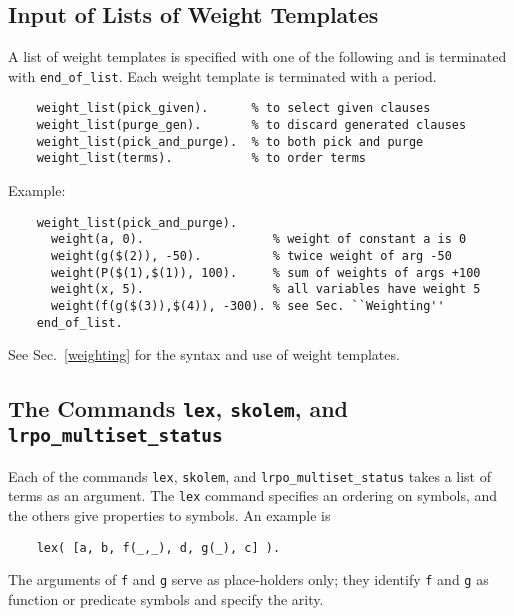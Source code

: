 \documentclass[11pt]{article}
\begin{document}
\subsection{Input of Lists of Weight Templates} \label{input-weight}

A list of weight templates is specified with one of the following and
is terminated with \verb:end_of_list:.
Each weight template is terminated with a period.

{\small
\begin{verbatim}
    weight_list(pick_given).      % to select given clauses
    weight_list(purge_gen).       % to discard generated clauses
    weight_list(pick_and_purge).  % to both pick and purge
    weight_list(terms).           % to order terms
\end{verbatim}
}
\noindent
Example:

{\small
\begin{verbatim}
    weight_list(pick_and_purge).
      weight(a, 0).                  % weight of constant a is 0
      weight(g($(2)), -50).          % twice weight of arg -50
      weight(P($(1),$(1)), 100).     % sum of weights of args +100
      weight(x, 5).                  % all variables have weight 5
      weight(f(g($(3)),$(4)), -300). % see Sec. ``Weighting''
    end_of_list.
\end{verbatim}
}
\noindent
See Sec.~\ref{weighting} for the syntax and use of weight templates.

\subsection{The Commands {\tt lex}, {\tt skolem},
               and {\tt lrpo\_multiset\_status}} \label{symbol-commands}

Each of the commands \verb:lex:, \verb:skolem:, and \verb:lrpo_multiset_status:
takes a list of terms as an argument.  The
\verb:lex: command specifies an ordering on symbols, and the
others give properties to symbols.  An example is

{\small
\begin{verbatim}
    lex( [a, b, f(_,_), d, g(_), c] ).
\end{verbatim}
}
\noindent
The arguments of \verb:f: and \verb:g: serve as place-holders only;
they identify \verb:f: and \verb:g: as function or predicate symbols
and specify the arity.
\end{document}
